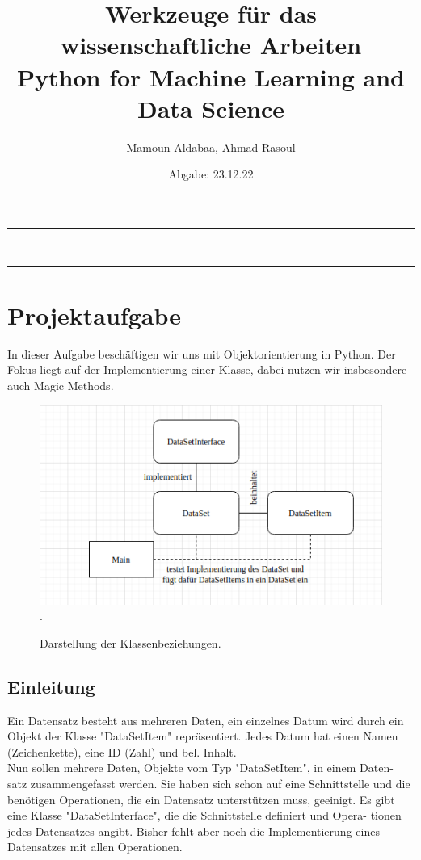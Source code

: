 \documentclass{article}
\title{Werkzeuge für das wissenschaftliche Arbeiten \\[0.1cm]  {\large Python for Machine Learning and Data Science} }
\author{ {\large Mamoun Aldabaa, Ahmad Rasoul } }
\date{Abgabe: 23.12.22}
\begin{document}
	
	\maketitle
\hrule\hfill\\	
	
	\tableofcontents
\hrule

	

\section{Projektaufgabe}
	In dieser Aufgabe beschäftigen wir uns mit Objektorientierung in Python. Der
	Fokus liegt auf der Implementierung einer Klasse, dabei nutzen wir insbesondere
	auch Magic Methods.
\begin{figure}[H]
		\begin{minipage}{\linewidth}
			\renewcommand{\footnoterule}{}
			\begin{center}
				\includegraphics[width=0.77\linewidth]{bild.png}.
			\end{center}
			\caption[Darstellung der Klassenbeziehungen] {Darstellung der Klassenbeziehungen.}
		\end{minipage}
\end{figure}
\subsection{Einleitung}
Ein Datensatz besteht aus mehreren Daten, ein einzelnes Datum wird durch ein
Objekt der Klasse "DataSetItem" repräsentiert. Jedes Datum hat einen Namen
(Zeichenkette), eine ID (Zahl) und bel. Inhalt.\\[0.25cm]

Nun sollen mehrere Daten, Objekte vom Typ "DataSetItem", in einem Daten-
satz zusammengefasst werden. Sie haben sich schon auf eine Schnittstelle und
die benötigen Operationen, die ein Datensatz unterstützen muss, geeinigt. Es
gibt eine Klasse "DataSetInterface", die die Schnittstelle definiert und Opera-
tionen jedes Datensatzes angibt. Bisher fehlt aber noch die Implementierung
eines Datensatzes mit allen Operationen.\\[0.25cm]
\end{document}
